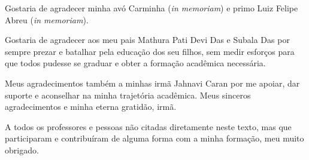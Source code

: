 \begin{agradecimentos}
	Gostaria de agradecer minha avó Carminha (\textit{in memoriam}) e primo Luiz Felipe Abreu (\textit{in memoriam}).

			Gostaria de agradecer aos meu pais Mathura Pati Devi Das e Subala Das por sempre prezar e batalhar pela educação dos seu filhos, sem medir esforços para que todos pudesse se graduar e obter a formação acadêmica necessária.

			Meus agradecimentos também a minhas irmã Jahnavi Caran por me apoiar, dar suporte e aconselhar na minha trajetória acadêmica. Meus sinceros agradecimentos e minha eterna gratidão, irmã.


			A todos os professores e pessoas não citadas diretamente neste texto, mas que participaram e contribuíram de alguma forma com a minha formação, meu muito obrigado.

\end{agradecimentos}
